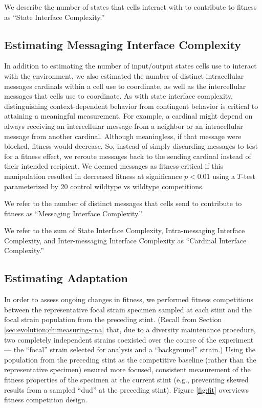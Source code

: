 We describe the number of states that cells interact with to contribute to fitness as ``State Interface Complexity.''

\subsection{Estimating Messaging Interface Complexity}
\label{sec:estimating-messaging-interface-complexity;ch:measuring-cna}

In addition to estimating the number of input/output states cells use to interact with the environment, we also estimated the number of distinct intracellular messages cardinals within a cell use to coordinate, as well as the intercellular messages that cells use to coordinate.
As with state interface complexity, distinguishing context-dependent behavior from contingent behavior is critical to attaining a meaningful measurement.
For example, a cardinal might depend on always receiving an intercellular message from a neighbor or an intracellular message from another cardinal.
Although meaningless, if that message were blocked, fitness would decrease.
So, instead of simply discarding messages to test for a fitness effect, we reroute messages back to the sending cardinal instead of their intended recipient.
We deemed messages as fitness-critical if this manipulation resulted in decreased fitness at significance $p < 0.01$ using a $T$-test parameterized by 20 control wildtype vs wildtype competitions.

We refer to the number of distinct messages that cells send to contribute to fitness as ``Messaging Interface Complexity.''

We refer to the sum of State Interface Complexity, Intra-messaging Interface Complexity, and Inter-messaging Interface Complexity as ``Cardinal Interface Complexity.''

\subsection{Estimating Adaptation}
\label{sec:measuring-adaptation;ch:measuring-cna}

In order to assess ongoing changes in fitness, we performed fitness competitions between the representative focal strain specimen sampled at each stint and the focal strain population from the preceding stint.
(Recall from Section \ref{sec:evolution;ch:measuring-cna} that, due to a diversity maintenance procedure, two completely independent strains coexisted over the course of the experiment --- the ``focal'' strain selected for analysis and a ``background'' strain.)
Using the population from the preceding stint as the competitive baseline (rather than the representative specimen) ensured more focused, consistent measurement of the fitness properties of the specimen at the current stint (e.g., preventing skewed results from a sampled ``dud'' at the preceding stint).
Figure \ref{fig:fit} overviews fitness competition design.




